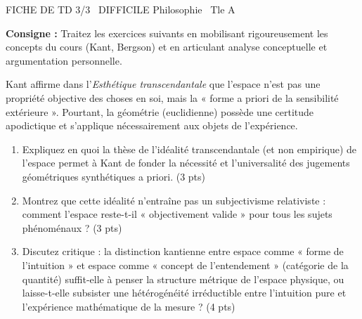 \documentclass[11pt]{article}
\begin{document}
\begin{tcolorbox}[enhanced,colback=popink,colframe=popink,arc=10pt,boxrule=0pt,left=12pt,right=12pt,top=9pt,bottom=9pt]
{\color{white}\popxbold\small FICHE DE TD 3/3 \textbullet\ DIFFICILE \hfill Philosophie \textbullet\ Tle A\par}
\end{tcolorbox}
\vspace{4pt}
\noindent\textbf{Consigne :} Traitez les exercices suivants en mobilisant rigoureusement les concepts du cours (Kant, Bergson) et en articulant analyse conceptuelle et argumentation personnelle.

\begin{exercice}
Kant affirme dans l'\textit{Esthétique transcendantale} que l'espace n'est pas une propriété objective des choses en soi, mais la « forme a priori de la sensibilité extérieure ». Pourtant, la géométrie (euclidienne) possède une certitude apodictique et s'applique nécessairement aux objets de l'expérience.
\begin{enumerate}
    \item Expliquez en quoi la thèse de l'idéalité transcendantale (et non empirique) de l'espace permet à Kant de fonder la nécessité et l'universalité des jugements géométriques synthétiques a priori. (3 pts)
    \item Montrez que cette idéalité n'entraîne pas un subjectivisme relativiste : comment l'espace reste-t-il « objectivement valide » pour tous les sujets phénoménaux ? (3 pts)
    \item Discutez critique : la distinction kantienne entre espace comme « forme de l'intuition » et espace comme « concept de l'entendement » (catégorie de la quantité) suffit-elle à penser la structure métrique de l'espace physique, ou laisse-t-elle subsister une hétérogénéité irréductible entre l'intuition pure et l'expérience mathématique de la mesure ? (4 pts)
\end{enumerate}
\end{exercice}
\end{document}

